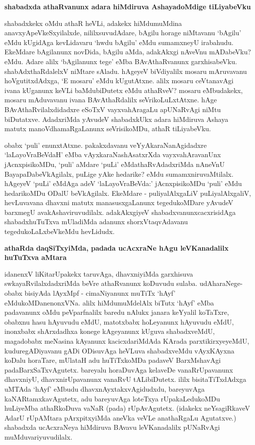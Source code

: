 {\bf shabadxda athaRvanunx adara hiMdiruva AshayadoMdige tiLiyabeVku}

shabadxkekx oMdu athaR heVLi, adakekx hiMdumuMdina anavxyApeVkeSxyilalxde, nililxsuvudAdare, bAgilu horage niMtavanu `bAgilu' eMdu kUgidAga kevLidavaru `hwdu bAgilu' eMdu sumamxneyU irabahudu. EkeMdare bAgilanunx novDida, bAgilu aMda, adakAkxgi nAveVnu mADabeVku? eMdu. Adare alilx `bAgilanunx tege' eMba BAvAthaRvanunx garxhisabeVku. shabAdxthaRdalelxV niMtare sAladu. hAgeyeV biVdiyalilx mosaru mAruvavanu hoVgutitxdAdxga, `E mosaru' eMdu kUgutAtxne. alilx mosaru ceVtanavAgi ivana kUganunx keVLi baMdubiDutetx eMdu athaRveV? mosaru eMbudakekx, mosaru mAduvavanu ivana BAvAthaRdalilx seVrikoLuLxtAtxne. hAge BAvAthaRvilalxdidadxre eSoTxV vayxvahAragaLu apUNaRvAgi niMtu biDutatxve. AdadxriMda yAvudeV shabadxkUkx adara hiMdiruva Ashaya matutx manoVdhamaRgaLanunx seVrisikoMDu, athaR tiLiyabeVku.

obabx `puli' enunxtAtxne. pakakxdavanu veYyAkaraNanAgidadxre `laLayoVraBeVdaH' eMba vAyxkaraNashAsatxrXda vayxvahAravanUnx jAcnxpisikoMDu, `puli' aMdare `puLi' eMdathaRvAdadxriMda nAneVnU BayapaDabeVkAgilalx, puLige yAke hedarike? eMdu sumamxniruvaMtilalx. hAgeyeV `puLi' eMdAga adeV `laLayoVraBeVda:' jAcnxpisikoMDu `puli' eMdu hedarikoMDu ODalU beVkAgilalx. EkeMdare - puliyalAlxgaLiV puLiyalAlxgaliV, hevLuvavana dhavxni matutx manasusxgaLanunx tegedukoMDare yAvudeV barxmegU avakAshaviruvudilalx. adakAkxgiyeV shabadxvanunxcacxrisidAga shabadxhuTuTxva mUladiMda adanunx shorxVtaqvAdavanu tegedukoLaLxbeVkeMdu hevLidudx.

{\bf athaRda daqSiTxyiMda, padada ucAcxraNe hAgu leVKanadalilx huTuTxva aMtara}

idanenxV liKitarUpakekx taruvAga, dhavxniyiMda garxhisuva swkayaRvilalxdadxriMda beVre athaRvanunx koDuvudu sulaba. udAharaNege- obabx bisiyAda lAyxMpf - cimaNiyanunx muTiTx `hAyf' eMdukoMDanenonxVNa. alilx hiMdumuMdelAlx biTutx `hAyf' eMba padavanunx oMdu peVparfnalilx baredu nAlukx janara keYyalil koTaTxre, obabxnu hasu hAyuvudu eMdU, matotxbabx hoLeyanunx hAyuvudu eMdU, inonxbabx shArxdadhxa konege kAgeyanunx kUguva shabadxveMdU, magadobabx meNasina kAyanunx kacicxdariMdAda KArada parxtikirxyeyeMdU, kuduregADiyavanu gADi ODisuvAga heVLuva shabadxveMdu vAyxKAyxna koDalu horaTare, mUlataH adu huTiTxkoMDa padaveV BarxMshavAgi padaBarxSaTxvAgutetx. bareyalu horaDuvAga kelaveDe vanaRrUpavanunx dhavxniyU, dhavxnirUpavanunx vanaRvU tALibiDutetx. ililx bisitaTiTxdAdxga uMTAda `hAyf' eMbudu dhavxnAyxtakxvAgidudxdu, bareyuvAga kaNARtamxkavAgutetx, adu bareyuvAga loteTxya rUpakaLedukoMDu  huLiyeMba athaRkoDuva vaNaR (pada) rUpAvAgutetx. (idakekx neYsagiRkaveV AdarU rUpAMtara pArxpitxyiMda aneVka veVLe anathaRgaLu Agutatxve.) shabadxda ucAcxraNeya hiMdiruva BAvavu leVKanadalilx pUNaRvAgi muMduvariyuvudilalx.

